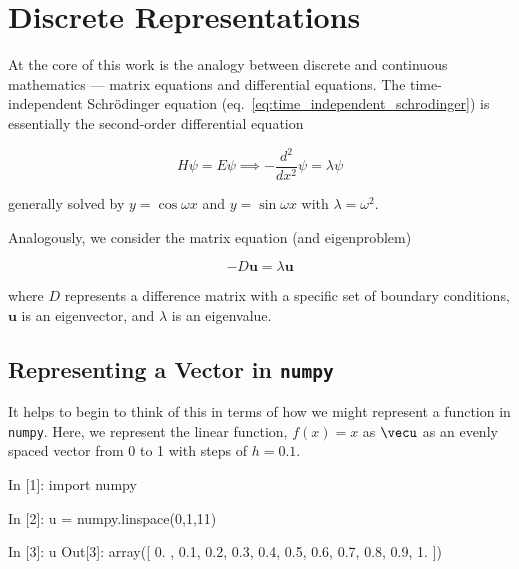 \documentclass[12pt,]{book}
\newenvironment{Shaded}{}{}
\newcommand{\DecValTok}[1]{\textcolor[rgb]{0.25,0.63,0.44}{{#1}}}
\newcommand{\FloatTok}[1]{\textcolor[rgb]{0.25,0.63,0.44}{{#1}}}
\newcommand{\ImportTok}[1]{{#1}}
\newcommand{\OperatorTok}[1]{\textcolor[rgb]{0.40,0.40,0.40}{{#1}}}
\newcommand{\NormalTok}[1]{{#1}}
\begin{document}
\section{Discrete Representations}\label{discrete-representations}

At the core of this work is the analogy between discrete and continuous
mathematics --- matrix equations and differential equations. The
time-independent Schrödinger equation
(eq.~\ref{eq:time_independent_schrodinger}) is essentially the
second-order differential equation

\begin{equation}H\psi=E\psi \implies -\frac{d^2 }{dx^2}\psi=\lambda \psi\label{eq:second_order_diff_eqn}\end{equation}

generally solved by \(y=\cos \omega x\) and \(y=\sin\omega x\) with
\(\lambda =\omega^2\).

Analogously, we consider the matrix equation (and eigenproblem)

\begin{equation} - D\mathbf{u} = \lambda \mathbf{u}\label{eq:second_difference_eigenproblem}\end{equation}

where \(D\) represents a difference matrix with a specific set of
boundary conditions, \(\mathbf{u}\) is an eigenvector, and \(\lambda\)
is an eigenvalue.

\subsection{\texorpdfstring{Representing a Vector in
\texttt{numpy}}{Representing a Vector in numpy}}\label{representing-a-vector-in-numpy}

It helps to begin to think of this in terms of how we might represent a
function in \texttt{numpy}. Here, we represent the linear function,
\(f(x)=x\) as \(\vecu\) as an evenly spaced vector from 0 to 1 with
steps of \(h=0.1\).

\begin{Shaded}
\begin{Highlighting}[]
\NormalTok{In [}\DecValTok{1}\NormalTok{]: }\ImportTok{import} \NormalTok{numpy}

\NormalTok{In [}\DecValTok{2}\NormalTok{]: u }\OperatorTok{=} \NormalTok{numpy.linspace(}\DecValTok{0}\NormalTok{,}\DecValTok{1}\NormalTok{,}\DecValTok{11}\NormalTok{)}

\NormalTok{In [}\DecValTok{3}\NormalTok{]: u}
\NormalTok{Out[}\DecValTok{3}\NormalTok{]: array([ }\DecValTok{0}\NormalTok{. ,  }\FloatTok{0.1}\NormalTok{,  }\FloatTok{0.2}\NormalTok{,  }\FloatTok{0.3}\NormalTok{,  }\FloatTok{0.4}\NormalTok{,  }\FloatTok{0.5}\NormalTok{,  }\FloatTok{0.6}\NormalTok{,  }\FloatTok{0.7}\NormalTok{,  }\FloatTok{0.8}\NormalTok{,  }\FloatTok{0.9}\NormalTok{,  }\DecValTok{1}\NormalTok{. ])}
\end{Highlighting}
\end{Shaded}
\end{document}
